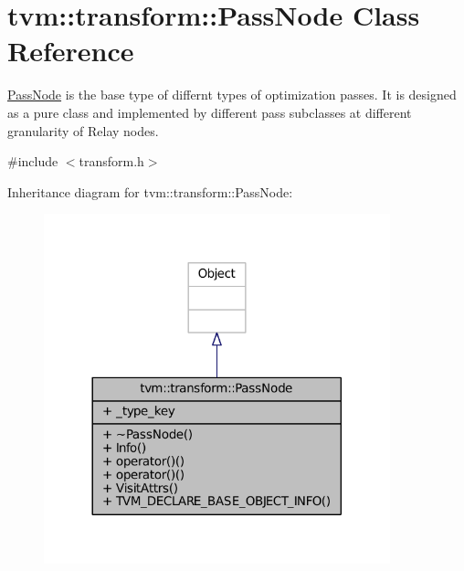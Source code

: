 \hypertarget{classtvm_1_1transform_1_1PassNode}{}\section{tvm\+:\+:transform\+:\+:Pass\+Node Class Reference}
\label{classtvm_1_1transform_1_1PassNode}


\hyperlink{classtvm_1_1transform_1_1PassNode}{Pass\+Node} is the base type of differnt types of optimization passes. It is designed as a pure class and implemented by different pass subclasses at different granularity of Relay nodes.  




{\ttfamily \#include $<$transform.\+h$>$}



Inheritance diagram for tvm\+:\+:transform\+:\+:Pass\+Node\+:
\nopagebreak
\begin{figure}[H]
\begin{center}
\leavevmode
\includegraphics[width=284pt]{classtvm_1_1transform_1_1PassNode__inherit__graph}
\end{center}
\end{figure}


